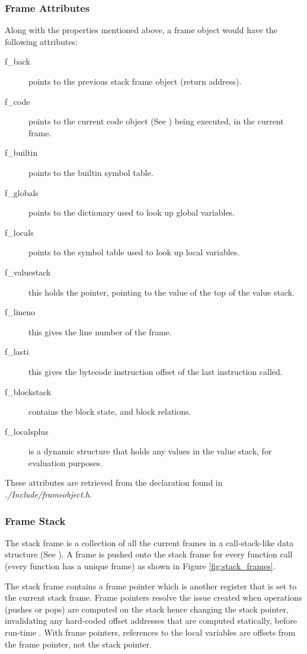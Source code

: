 {			\subsubsection*{Frame Attributes}
			\par Along with the properties mentioned above, a frame object would have the following attributes:
			\begin{description}
				\item [f\_back] points to the previous stack frame object (return address).
				\item [f\_code] points to the current code object (See {\bfseries{}}) being executed, in the current frame.
				\item [f\_builtin] points to the builtin symbol table.
				\item [f\_globals] points to the dictionary used to look up global variables.
				\item [f\_locals] points to the symbol table used to look up local variables.
				\item [f\_valuestack] this holds the pointer, pointing to the value of the top of the value stack.
				\item [f\_lineno] this gives the line number of the frame.
				\item [f\_lasti] this gives the bytecode instruction offset of the last instruction called.
				\item [f\_blockstack] contains the block state, and block relations.
				\item [f\_localsplus] is a dynamic structure that holds any values in the value stack, for evaluation purposes.
			\end{description}

			These attributes are retrieved from the declaration found in \textit{./Include/frameobject.h}.

			\subsubsection*{Frame Stack}
			\par The stack frame is a collection of all the current frames in a call-stack-like data structure (See {\bfseries{}}).
			A frame is pushed onto the stack frame for every function call (every function has a unique frame) as shown in Figure \ref{fig:stack_frames}.
			\par The stack frame contains a frame pointer which is another register that is set to the current stack frame. Frame pointers resolve the issue created 
			when operations (pushes or pops) are computed on the stack hence changing the stack pointer, invalidating any hard-coded offset addresses that are computed statically, before run-time \cite[]{stack2011csuwm}.
			With frame pointers, references to the local variables are offsets from the frame pointer, not the stack pointer.
			\begin{figure}[H]
				

\end{figure}}

